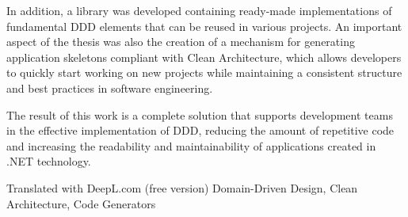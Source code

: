 \documentclass[
    left=2.5cm,         %
    right=2.5cm,        %
    top=2.5cm,          %
    bottom=3cm,         %
    bindingoffset=6mm,  %
    nohyphenation=false %
]{eiti/eiti-thesis}
\begin{document}
In addition, a library was developed containing ready-made implementations of fundamental DDD elements that can be reused in various projects. An important aspect of the thesis was also the creation of a mechanism for generating application skeletons compliant with Clean Architecture, which allows developers to quickly start working on new projects while maintaining a consistent structure and best practices in software engineering.

The result of this work is a complete solution that supports development teams in the effective implementation of DDD, reducing the amount of repetitive code and increasing the readability and maintainability of applications created in .NET technology.

Translated with DeepL.com (free version)
\keywords Domain-Driven Design, Clean Architecture, Code Generators


\cleardoublepage %
\tableofcontents

\cleardoublepage %
\pagestyle{headings}

  








\cleardoublepage %
\printbibliography

\newpage
\pagestyle{plain}

\vspace{0.8cm}
\acronymlist
{}
\end{document}
